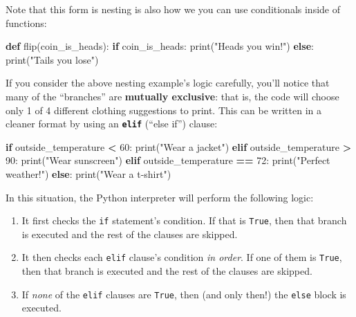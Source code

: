 \documentclass[]{book}
\newenvironment{Shaded}{\begin{snugshade}}{\end{snugshade}}
\newcommand{\KeywordTok}[1]{\textcolor[rgb]{0.13,0.29,0.53}{\textbf{#1}}}
\newcommand{\DecValTok}[1]{\textcolor[rgb]{0.00,0.00,0.81}{#1}}
\newcommand{\StringTok}[1]{\textcolor[rgb]{0.31,0.60,0.02}{#1}}
\newcommand{\ControlFlowTok}[1]{\textcolor[rgb]{0.13,0.29,0.53}{\textbf{#1}}}
\newcommand{\OperatorTok}[1]{\textcolor[rgb]{0.81,0.36,0.00}{\textbf{#1}}}
\newcommand{\BuiltInTok}[1]{#1}
\newcommand{\NormalTok}[1]{#1}
\providecommand{\tightlist}{%
  \setlength{\itemsep}{0pt}\setlength{\parskip}{0pt}}
\begin{document}
Note that this form is nesting is also how we you can use conditionals
inside of functions:

\begin{Shaded}
\begin{Highlighting}[]
\KeywordTok{def}\NormalTok{ flip(coin_is_heads):}
    \ControlFlowTok{if}\NormalTok{ coin_is_heads:}
        \BuiltInTok{print}\NormalTok{(}\StringTok{"Heads you win!"}\NormalTok{)}
    \ControlFlowTok{else}\NormalTok{:}
        \BuiltInTok{print}\NormalTok{(}\StringTok{"Tails you lose"}\NormalTok{)}
\end{Highlighting}
\end{Shaded}

If you consider the above nesting example's logic carefully, you'll
notice that many of the ``branches'' are \textbf{mutually exclusive}:
that is, the code will choose only 1 of 4 different clothing suggestions
to print. This can be written in a cleaner format by using an
\textbf{\texttt{elif}} (``else if'') clause:

\begin{Shaded}
\begin{Highlighting}[]
\ControlFlowTok{if}\NormalTok{ outside_temperature }\OperatorTok{<} \DecValTok{60}\NormalTok{:}
    \BuiltInTok{print}\NormalTok{(}\StringTok{"Wear a jacket"}\NormalTok{)}
\ControlFlowTok{elif}\NormalTok{ outside_temperature }\OperatorTok{>} \DecValTok{90}\NormalTok{:}
    \BuiltInTok{print}\NormalTok{(}\StringTok{"Wear sunscreen"}\NormalTok{)}
\ControlFlowTok{elif}\NormalTok{ outside_temperature }\OperatorTok{==} \DecValTok{72}\NormalTok{:}
    \BuiltInTok{print}\NormalTok{(}\StringTok{"Perfect weather!"}\NormalTok{)}
\ControlFlowTok{else}\NormalTok{:}
    \BuiltInTok{print}\NormalTok{(}\StringTok{"Wear a t-shirt"}\NormalTok{)}
\end{Highlighting}
\end{Shaded}

In this situation, the Python interpreter will perform the following
logic:

\begin{enumerate}
\def\labelenumi{\arabic{enumi}.}
\tightlist
\item
  It first checks the \texttt{if} statement's condition. If that is
  \texttt{True}, then that branch is executed and the rest of the
  clauses are skipped.
\item
  It then checks each \texttt{elif} clause's condition \emph{in order}.
  If one of them is \texttt{True}, then that branch is executed and the
  rest of the clauses are skipped.
\item
  If \emph{none} of the \texttt{elif} clauses are \texttt{True}, then
  (and only then!) the \texttt{else} block is executed.
\end{enumerate}
\end{document}
